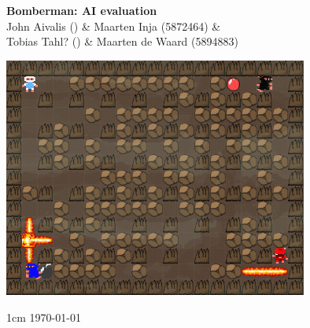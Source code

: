 

\begin{center}
\Huge \textbf{Bomberman: AI evaluation}\\
\vspace*{0.8cm}
\Large John Aivalis () \& Maarten Inja (5872464) \& \\ Tobias Tahl? () \& Maarten de Waard (5894883) 

\vspace*{4cm}

\includegraphics[width=10cm]{resources/bbman}

\vfill{1cm}
\today

\end{center}
\thispagestyle{empty}
